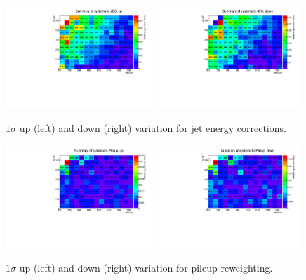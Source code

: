\begin{figure}[htpb]
\includegraphics[width=0.49\textwidth]{figures/app_sig_syst/sys_JEC_up}
\includegraphics[width=0.49\textwidth]{figures/app_sig_syst/sys_JEC_down}
\caption{$1\sigma$ up (left) and down (right) variation for jet energy corrections.}
\end{figure}

\begin{figure}[htpb]
\includegraphics[width=0.49\textwidth]{figures/app_sig_syst/sys_Pileup_up}
\includegraphics[width=0.49\textwidth]{figures/app_sig_syst/sys_Pileup_down}
\caption{$1\sigma$ up (left) and down (right) variation for pileup reweighting.}
\end{figure}


